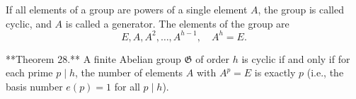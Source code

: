 If all elements of a group are powers of a single element $A$, the group is called cyclic, and $A$ is called a generator. The elements of the group are
$$E, A, A^2, \ldots, A^{h-1}, \quad A^h = E.$$

**Theorem 28.** A finite Abelian group $\mathfrak{G}$ of order $h$ is cyclic if and only if for each prime $p \mid h$, the number of elements $A$ with $A^p = E$ is exactly $p$ (i.e., the basis number $e(p) = 1$ for all $p \mid h$).
